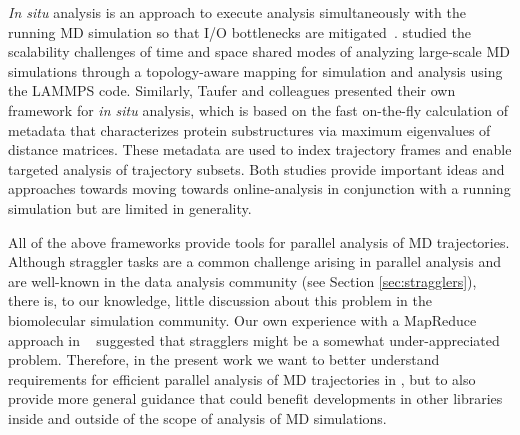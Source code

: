 \textit{In situ} analysis is an approach to execute analysis simultaneously with the running MD simulation so that I/O bottlenecks are  mitigated~\cite{Malakar-etal, Johnston:2017aa}.
\citet{Malakar-etal} studied the scalability challenges of time and space shared modes of analyzing large-scale MD simulations through a topology-aware mapping for simulation and analysis using the LAMMPS code.
Similarly, Taufer and colleagues \cite{Johnston:2017aa} presented their own framework for \textit{in situ} analysis, which is based on the fast on-the-fly calculation of metadata that characterizes protein substructures via maximum eigenvalues of distance matrices.
These metadata are used to index trajectory frames and enable targeted analysis of trajectory subsets.
Both studies provide important ideas and approaches towards moving towards online-analysis in conjunction with a running simulation but are limited in generality.

All of the above frameworks provide tools for parallel analysis of MD trajectories. 
Although straggler tasks are a common challenge arising in parallel analysis and are well-known in the data analysis community (see Section \ref{sec:stragglers}), there is, to our knowledge, little discussion about this problem in the biomolecular simulation community.
Our own experience with a MapReduce approach in ~\cite{Khoshlessan:2017ab, Fan:2019aa} suggested that stragglers might be a somewhat under-appreciated problem.
Therefore, in the present work we want to better understand requirements for efficient parallel analysis of MD trajectories in , but to also provide more general guidance that could benefit developments in other libraries inside and outside of the scope of analysis of MD simulations.




